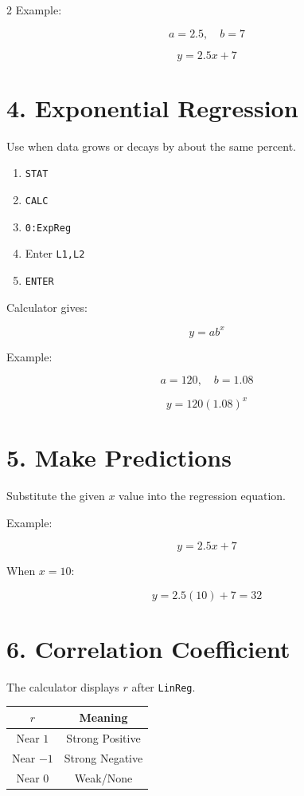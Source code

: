 \documentclass[10pt]{article}
\begin{document}
\begin{multicols}{2}
Example:

\[
a=2.5,\quad b=7
\]

\[
\boxed{y=2.5x+7}
\]

\section*{4. Exponential Regression}

Use when data grows or decays by about the same percent.

\begin{enumerate}
\item \texttt{STAT}
\item \texttt{CALC}
\item \texttt{0:ExpReg}
\item Enter \texttt{L1,L2}
\item \texttt{ENTER}
\end{enumerate}

Calculator gives:

\[
y=ab^x
\]

Example:

\[
a=120,\quad b=1.08
\]

\[
\boxed{y=120(1.08)^x}
\]

\columnbreak

\section*{5. Make Predictions}

Substitute the given $x$ value into the regression equation.

Example:

\[
y=2.5x+7
\]

When $x=10$:

\[
y=2.5(10)+7=32
\]

\section*{6. Correlation Coefficient}

The calculator displays $r$ after \texttt{LinReg}.

\vspace{0.3em}

\begin{tabular}{|c|c|}
\hline
$r$ & Meaning\\
\hline
Near $1$ & Strong Positive\\
\hline
Near $-1$ & Strong Negative\\
\hline
Near $0$ & Weak/None\\
\hline
\end{tabular}


\end{multicols}
\end{document}
